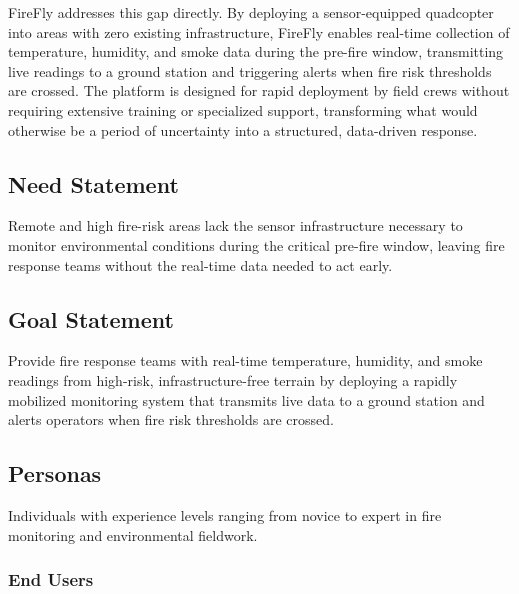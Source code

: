 \documentclass[journal, onecolumn]{IEEEtran}
\begin{document}
FireFly addresses this gap directly. By deploying a sensor-equipped quadcopter into areas with zero existing infrastructure, FireFly enables real-time collection of temperature, humidity, and smoke data during the pre-fire window, transmitting live readings to a ground station and triggering alerts when fire risk thresholds are crossed. The platform is designed for rapid deployment by field crews without requiring extensive training or specialized support, transforming what would otherwise be a period of uncertainty into a structured, data-driven response.

\subsection{Need Statement}
Remote and high fire-risk areas lack the sensor infrastructure necessary to monitor environmental conditions during the critical pre-fire window, leaving fire response teams without the real-time data needed to act early.

\subsection{Goal Statement}
Provide fire response teams with real-time temperature, humidity, and smoke readings from high-risk, infrastructure-free terrain by deploying a rapidly mobilized monitoring system that transmits live data to a ground station and alerts operators when fire risk thresholds are crossed.

\subsection{Personas}
Individuals with experience levels ranging from novice to expert in fire monitoring and environmental fieldwork.

\subsubsection*{End Users}
\end{document}
